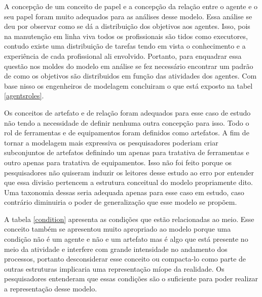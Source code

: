 A concepção de um conceito de papel e a concepção da relação entre o agente e o seu papel foram muito adequados para as análises desse modelo. Essa análise se deu por observar como se dá 
a distribuição dos objetivos aos agentes. Isso, pois na manutenção em linha viva todos os profissionais são tidos como executores, contudo existe uma distribuição de tarefas tendo em vista 
o conhecimento e a experiência de cada profissional ali envolvido. Portanto, para enquadrar essa questão nos moldes do modelo em análise se fez necessário encontrar um padrão de como os objetivos 
são distribuidos em função das atividades dos agentes. Com base nisso os engenheiros de modelagem concluiram o que está exposto na tabel \ref{agentsroles}.

Os conceitos de artefato e de relação foram adequados para esse caso de estudo não tendo a necessidade de definir nenhuma outra concepção para isso. Todo o rol de ferramentas e de equipamentos 
foram definidos como artefatos. A fim de tornar a modelagem mais expressiva os pesquisadores poderiam criar subconjuntos de artefatos definindo um apenas para tratativa de ferramentas e outro 
apenas para tratativa de equipamentos. Isso não foi feito porque os pesquisadores não quiseram induzir os leitores desse estudo ao erro por entender que essa divisão pertencem a estrutura conceitual 
do modelo propriamente dito. Uma taxonomia dessas seria adequada apenas para esse caso em estudo, caso contrário diminuiria o poder de generalização que esse modelo se propõem. 

A tabela \ref{condition} apresenta as condições que estão relacionadas ao meio. Esse conceito também se apresentou muito apropriado ao modelo porque uma condição não é um agente e não e um artefato 
mas é algo que está presente no meio da atividade e interfere com grande intensidade no andamento dos processos, portanto desconsiderar esse conceito ou compacta-lo como parte de outras estruturas 
implicaria uma representação míope da realidade. Os pesquisadores entenderam que essas condições são o suficiente para poder realizar a representação desse modelo.

